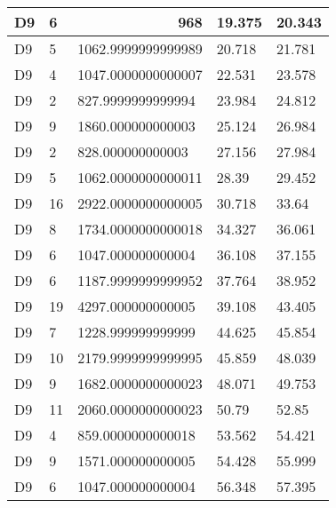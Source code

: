 \begin{longtable}{|l|l|l|l|l|}
D9 & 6 & \multicolumn{1}{r|}{968} & 19.375 & 20.343 \\ \hline
D9 & 5 & 1062.9999999999989 & 20.718 & 21.781 \\ \hline
D9 & 4 & 1047.0000000000007 & 22.531 & 23.578 \\ \hline
D9 & 2 & 827.9999999999994 & 23.984 & 24.812 \\ \hline
D9 & 9 & 1860.000000000003 & 25.124 & 26.984 \\ \hline
D9 & 2 & 828.000000000003 & 27.156 & 27.984 \\ \hline
D9 & 5 & 1062.0000000000011 & 28.39 & 29.452 \\ \hline
D9 & 16 & 2922.0000000000005 & 30.718 & 33.64 \\ \hline
D9 & 8 & 1734.0000000000018 & 34.327 & 36.061 \\ \hline
D9 & 6 & 1047.000000000004 & 36.108 & 37.155 \\ \hline
D9 & 6 & 1187.9999999999952 & 37.764 & 38.952 \\ \hline
D9 & 19 & 4297.000000000005 & 39.108 & 43.405 \\ \hline
D9 & 7 & 1228.999999999999 & 44.625 & 45.854 \\ \hline
D9 & 10 & 2179.9999999999995 & 45.859 & 48.039 \\ \hline
D9 & 9 & 1682.0000000000023 & 48.071 & 49.753 \\ \hline
D9 & 11 & 2060.0000000000023 & 50.79 & 52.85 \\ \hline
D9 & 4 & 859.0000000000018 & 53.562 & 54.421 \\ \hline
D9 & 9 & 1571.000000000005 & 54.428 & 55.999 \\ \hline
D9 & 6 & 1047.000000000004 & 56.348 & 57.395 \\ \hline
\end{longtable}
\pagebreak
